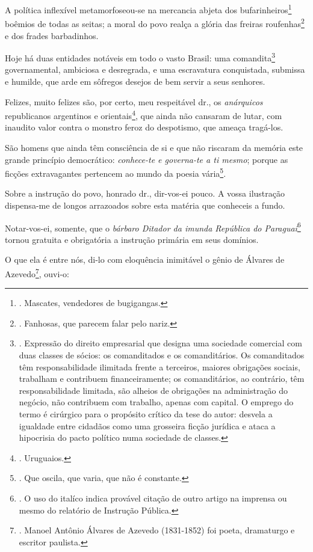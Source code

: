A política inflexível metamorfoseou-se na mercancia abjeta dos
bufarinheiros\footnote{. Mascates, vendedores de bugigangas.} boêmios de
todas as seitas; a moral do povo realça a glória das freiras
roufenhas\footnote{. Fanhosas, que parecem falar pelo nariz.} e dos
frades barbadinhos.

Hoje há duas entidades notáveis em todo o vasto Brasil: uma
comandita\footnote{. Expressão do direito empresarial que designa uma
  sociedade comercial com duas classes de sócios: os comanditados e os
  comanditários. Os comanditados têm responsabilidade ilimitada frente a
  terceiros, maiores obrigações sociais, trabalham e contribuem
  financeiramente; os comanditários, ao contrário, têm responsabilidade
  limitada, são alheios de obrigações na administração do negócio, não
  contribuem com trabalho, apenas com capital. O emprego do termo é
  cirúrgico para o propósito crítico da tese do autor: desvela a
  igualdade entre cidadãos como uma grosseira ficção jurídica e ataca a
  hipocrisia do pacto político numa sociedade de classes.}
governamental, ambiciosa e desregrada, e uma escravatura conquistada,
submissa e humilde, que arde em sôfregos desejos de bem servir a seus
senhores.

Felizes, muito felizes são, por certo, meu respeitável dr., os
\emph{anárquicos} republicanos argentinos e orientais\footnote{.
  Uruguaios.}, que ainda não cansaram de lutar, com inaudito valor
contra o monstro feroz do despotismo, que ameaça tragá-los.

São homens que ainda têm consciência de si e que não riscaram da memória
este grande princípio democrático: \emph{conhece-te e governa-te a ti
mesmo}; porque as ficções extravagantes pertencem ao mundo da poesia
vária\footnote{. Que oscila, que varia, que não é constante.}.

Sobre a instrução do povo, honrado dr., dir-vos-ei pouco. A vossa
ilustração dispensa-me de longos arrazoados sobre esta matéria que
conheceis a fundo.

Notar-vos-ei, somente, que o \emph{bárbaro Ditador da imunda República
do Paraguai}\footnote{. O uso do italíco indica provável citação de
  outro artigo na imprensa ou mesmo do relatório de Instrução Pública.}
tornou gratuita e obrigatória a instrução primária em seus domínios.

O que ela é entre nós, di-lo com eloquência inimitável o gênio de
Álvares de Azevedo\footnote{. Manoel Antônio Álvares de Azevedo
  (1831-1852) foi poeta, dramaturgo e escritor paulista.}, ouvi-o:

